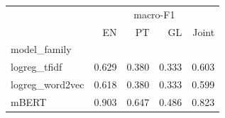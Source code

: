 \begin{tabular}{lrrrr}
\toprule
 & \multicolumn{4}{c}{macro-F1} \\
 & EN & PT & GL & Joint \\
model\_family &  &  &  &  \\
\midrule
logreg\_tfidf & 0.629 & 0.380 & 0.333 & 0.603 \\
logreg\_word2vec & 0.618 & 0.380 & 0.333 & 0.599 \\
mBERT & 0.903 & 0.647 & 0.486 & 0.823 \\
\bottomrule
\end{tabular}
